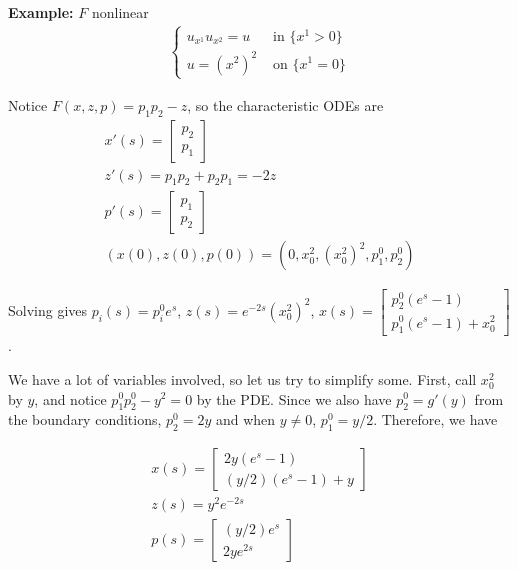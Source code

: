 \documentclass{article}
\begin{document}
	\vspace{0.25 cm}
	
	\textbf{Example:} $F$ nonlinear
	\begin{align*}
		\begin{cases}
			u_{x^1}u_{x^2} =u & \text{ in } \{x^{1} > 0 \} \\
			u = (x^2)^2 & \text{ on } \{x^{1} = 0\}
		\end{cases}
	\end{align*}
	
	
	Notice $F(x,z,p) = p_1p_2 - z$, so the characteristic ODEs are
	\begin{align*}
		x'(s) = \begin{bmatrix}p_2 \\ p_1 \end{bmatrix} \\
		z'(s) = p_1p_2+p_2p_1 = -2z \\
		p'(s) = \begin{bmatrix} p_1 \\ p_2\end{bmatrix} \\
		(x(0),z(0),p(0)) = (0,x^{2}_{0},(x^{2}_{0})^{2},p_{1}^{0},p_{2}^{0})
	\end{align*}
	
	Solving gives $p_i(s) = p_{i}^{0} e^{s}$, $z(s) = e^{-2s}(x^{2}_{0})^{2}$, $x(s) = \begin{bmatrix}p_{2}^{0}(e^s-1) \\ p_{1}^{0}(e^{s}-1)+x^{2}_{0} \end{bmatrix} $.
	
	We have a lot of variables involved, so let us try to simplify some. First, call $x^{2}_{0}$ by $y$, and notice $p_{1}^{0}p_{2}^{0} - y^2 = 0$ by the PDE. Since we also have $p_{2}^{0} = g'(y)$ from the boundary conditions, $p_{2}^{0} = 2y$ and when $y \neq 0$, $p_{1}^{0} = y/2$. Therefore, we have
	
	\begin{align*}
		x(s) = \begin{bmatrix}2y(e^s-1) \\ (y/2)(e^{s}-1)+y \end{bmatrix} \\
		z(s) = y^{2}e^{-2s} \\
		p(s) = \begin{bmatrix}(y/2)e^{s} \\ 2ye^{2s} \end{bmatrix}
	\end{align*}
	
\end{document}
